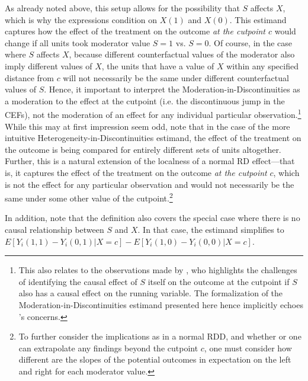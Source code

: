 \documentclass[12pt]{article}
\begin{document}
As already noted above, this setup allows for the possibility that $S$ affects $X$, which is why the expressions condition on $X(1)$ and $X(0)$. This estimand captures how the effect of the treatment on the outcome \emph{at the cutpoint $c$} would change if all units took moderator value $S=1$ vs. $S=0$. Of course, in the case where $S$ affects $X$, because different counterfactual values of the moderator also imply different values of $X$, the units that have a value of $X$ within any specified distance from $c$ will not necessarily be the same under different counterfactual values of $S$. Hence, it important to interpret the Moderation-in-Discontinuities as a moderation to the effect at the cutpoint (i.e. the discontinuous jump in the CEFs), not the moderation of an effect for any individual particular observation.\footnote{
This also relates to the observations made by \cite{marshall2019}, who highlights the challenges of identifying the causal effect of $S$ itself on the outcome at the cutpoint if $S$ also has a causal effect on the running variable. The formalization of the Moderation-in-Discontinuities estimand presented here hence implicitly echoes  \citeauthor{marshall2019}'s concerns.%
} While this may at first impression seem odd, note that in the case of the more intuitive Heterogeneity-in-Discontinuities estimand, the effect of the treatment on the outcome is being compared for entirely different sets of units altogether. Further, this is a natural extension of the localness of a normal RD effect---that is, it captures the effect of the treatment on the outcome \emph{at the cutpoint} $c$, which is not the effect for any particular observation and would not necessarily be the same under some other value of the cutpoint.\footnote{To further consider the implications as in a normal RDD, and whether or one can extrapolate any findings beyond the cutpoint $c$, one must consider how different are the slopes of the potential outcomes in expectation on the left and right for each moderator value.}

In addition, note that the definition also covers the special case where there is no causal relationship between $S$ and $X$. In that case, the estimand simplifies to $E[Y_i(1,1) - Y_i(0,1) | X=c] - E[Y_i(1,0) - Y_i(0,0) | X=c]$.

\end{document}
